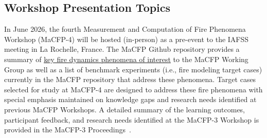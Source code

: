 \documentclass[12pt]{article}
\begin{document}
\subsection{Workshop Presentation Topics}
\label{ssec:MaCFP-4 Target Cases}
In June 2026, the fourth Measurement and Computation of Fire Phenomena Workshop (MaCFP-4) will be hosted (in-person) as a pre-event to the IAFSS meeting in La Rochelle, France. 
The MaCFP Github repository provides a summary of \href{https://github.com/MaCFP/macfp-db/blob/master/Documents/FIRE_PHENOMENA.md}{ key fire dynamics phenomena of interest} to the MaCFP Working Group as well as a list of benchmark experiments (i.e., fire modeling target cases) currently in the MaCFP repository that address these phenomena. Target cases selected for study at MaCFP-4 are designed to address these fire phenomena with special emphasis maintained on knowledge gaps and research needs identified at previous MaCFP Workshops. A detailed summary of the learning outcomes, participant feedback, and research needs identified at the MaCFP-3 Workshop is provided in the MaCFP-3 Proceedings~\cite{MaCFP3Proceedings}.\\
\end{document}
